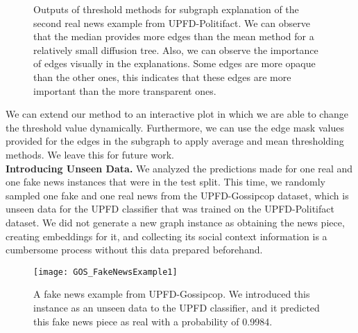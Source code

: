 \begin{figure}
    \centering
    \hfill
    \hfill
    \hfill
    \caption[Outputs of threshold methods for subgraph explanation of the second real news example from UPFD-Politifact.]{Outputs of threshold methods for subgraph explanation of the second real news example from UPFD-Politifact. We can observe that the median provides more edges than the mean method for a relatively small diffusion tree. Also, we can observe the importance of edges visually in the explanations. Some edges are more opaque than the other ones, this indicates that these edges are more important than the more transparent ones.}
    \label{fig:POL_RealNewsExample2Explanation_with_threshold}
\end{figure}
We can extend our method to an interactive plot in which we are able to change the threshold value dynamically. Furthermore, we can use the edge mask values provided for the edges in the subgraph to apply average and mean thresholding methods. We leave this for future work.\\
\textbf{Introducing Unseen Data.} We analyzed the predictions made for one real and one fake news instances that were in the test split. This time, we randomly sampled one fake and one real news from the UPFD-Gossipcop dataset, which is unseen data for the UPFD classifier that was trained on the UPFD-Politifact dataset. We did not generate a new graph instance as obtaining the news piece, creating embeddings for it, and collecting its social context information is a cumbersome process without this data prepared beforehand.\\
\begin{figure}
    \centering
    \texttt{[image: GOS\_FakeNewsExample1]}
    \caption[A fake news example from UPFD-Gossipcop.]{A fake news example from UPFD-Gossipcop. We introduced this instance as an unseen data to the UPFD classifier, and it predicted this fake news piece as real with a probability of 0.9984.}
    \label{fig:GOS_FakeNewsExample1}
\end{figure}
